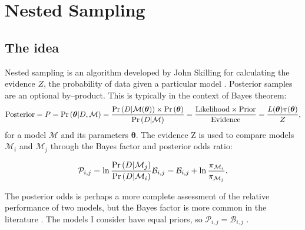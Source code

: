 \documentclass{article}
\begin{document}
\section{Nested Sampling}
\subsection{The idea}
Nested sampling is an algorithm developed by John Skilling for calculating the evidence $Z$, the probability of data given a particular model \cite{skilling} \cite{Ashton_2022}. Posterior samples are an optional by--product. This is typically in the context of Bayes theorem:
\begin{equation}
  \textrm{Posterior} = P = \Pr\left(\bm{\theta}| D, \mathcal{M}\right) = \frac{\Pr\left(D|\mathcal{M}(\bm\theta)\right) \times \Pr\left(\bm\theta\right)}{\Pr\left(D|\mathcal{M}\right)} = \frac{\textrm{Likelihood} \times \textrm{Prior}}{\textrm{Evidence}} = \frac{L(\bm\theta) \pi(\bm{\theta})}{Z}\textrm,
  \label{bayes}
\end{equation}
%
for a model $\mathcal{M}$ and its parameters $\bm{\theta}$. The evidence Z is used to compare models $\mathcal{M}_i$ and $\mathcal{M}_j$ through the Bayes factor and posterior odds ratio:

\begin{equation}
  \mathcal{P}_{i, j} = \ln\frac{\Pr\left(D|\mathcal{M}_j\right)}{\Pr\left(D|\mathcal{M}_i\right)}
  \mathcal{B}_{i, j} = \mathcal{B}_{i, j} + \ln\frac{\pi_{\mathcal{M}_i}}{\pi_{\mathcal{M}_j}}\textrm.
\end{equation}

The posterior odds is perhaps a more complete assessment of the relative performance of two models, but the Bayes factor is more common in the literature \cite{Sonke}. The models I consider have equal priors, so $\mathcal{P}_{i,j} = \mathcal{B}_{i,j}$ \cite{Sonke}.
\end{document}
